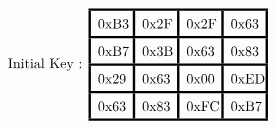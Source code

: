 \[
    \text{Initial Key : }
    \renewcommand{\arraystretch}{1.5}
    \setlength{\arrayrulewidth}{0.6mm}
    \setlength{\tabcolsep}{0.5em}
    \begin{array}{|>{\centering\arraybackslash}m{2em}|>{\centering\arraybackslash}m{2em}|>{\centering\arraybackslash}m{2em}|>{\centering\arraybackslash}m{2em}|}
        \hline
        \text{0xB3} & \text{0x2F} & \text{0x2F} & \text{0x63} \\
        \hline
        \text{0xB7} & \text{0x3B} & \text{0x63} & \text{0x83} \\
        \hline
        \text{0x29} & \text{0x63} & \text{0x00} & \text{0xED} \\
        \hline
        \text{0x63} & \text{0x83} & \text{0xFC} & \text{0xB7} \\
        \hline
    \end{array}
\]
